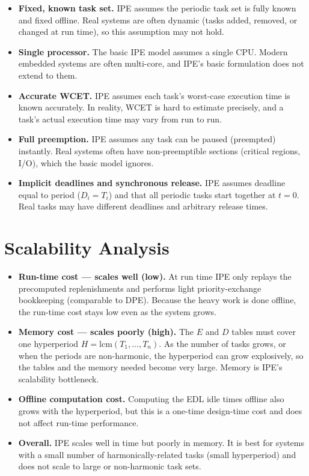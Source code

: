 \documentclass[conference]{IEEEtran}
\begin{document}
\begin{itemize}
  \item \textbf{Fixed, known task set.} IPE assumes the periodic task set is
        fully known and fixed offline. Real systems are often dynamic (tasks
        added, removed, or changed at run time), so this assumption may not
        hold.
  \item \textbf{Single processor.} The basic IPE model assumes a single CPU.
        Modern embedded systems are often multi-core, and IPE's basic
        formulation does not extend to them.
  \item \textbf{Accurate WCET.} IPE assumes each task's worst-case execution
        time is known accurately. In reality, WCET is hard to estimate
        precisely, and a task's actual execution time may vary from run to run.
  \item \textbf{Full preemption.} IPE assumes any task can be paused (preempted)
        instantly. Real systems often have non-preemptible sections (critical
        regions, I/O), which the basic model ignores.
  \item \textbf{Implicit deadlines and synchronous release.} IPE assumes
        deadline equal to period ($D_i = T_i$) and that all periodic tasks
        start together at $t = 0$. Real tasks may have different deadlines and
        arbitrary release times.
\end{itemize}

\section{Scalability Analysis}

\begin{itemize}
  \item \textbf{Run-time cost --- scales well (low).} At run time IPE only
        replays the precomputed replenishments and performs light
        priority-exchange bookkeeping (comparable to DPE). Because the heavy
        work is done offline, the run-time cost stays low even as the system
        grows.
  \item \textbf{Memory cost --- scales poorly (high).} The $E$ and $D$ tables
        must cover one hyperperiod $H = \mathrm{lcm}(T_1,\dots,T_n)$. As the
        number of tasks grows, or when the periods are non-harmonic, the
        hyperperiod can grow explosively, so the tables and the memory needed
        become very large. Memory is IPE's scalability bottleneck.
  \item \textbf{Offline computation cost.} Computing the EDL idle times offline
        also grows with the hyperperiod, but this is a one-time design-time cost
        and does not affect run-time performance.
  \item \textbf{Overall.} IPE scales well in time but poorly in memory. It is
        best for systems with a small number of harmonically-related tasks
        (small hyperperiod) and does not scale to large or non-harmonic task
        sets.
\end{itemize}
\end{document}
